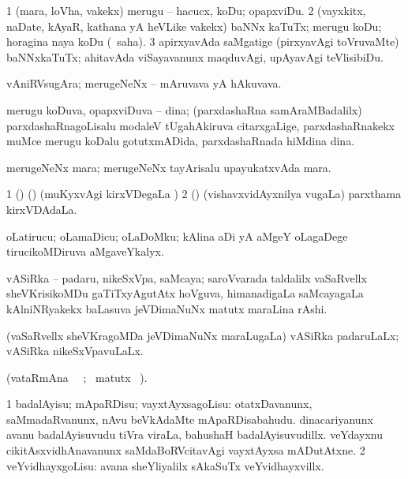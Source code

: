 \bentry
{} 
\gl{\sakirx}
\expl{}
\bmng
\bnum
\num{1} (mara, loVha, \mo vakekx) merugu -- hacucx, koDu; opapxviDu. 
\num{2} (vayxkitx, naDate, kAyaR, kathana yA heVLike \mo vakekx) baNNx kaTuTx; merugu koDu; horagina naya koDu (\akirx\ saha). 
\num{3} apirxyavAda saMgatige (pirxyavAgi toVruvaMte) baNNxkaTuTx; ahitavAda viSayavanunx maqduvAgi, upAyavAgi teVlisibiDu. 
\enum
\emng
\eentry

\bentry
{} 
\gl{\nA}
\expl{}
\bmng
 vAniRVsugAra; merugeNeNx -- mAruvava yA hAkuvava. 
\emng
\eentry

\bentry
{} 
\gl{\nA}
\expl{}
\bmng
 merugu koDuva, opapxviDuva -- dina; (parxdashaRna samAraMBadalilx) parxdashaRnagoLisalu modaleV tUgahAkiruva citarxgaLige, parxdashaRnakekx muMce merugu koDalu gotutxmADida, parxdashaRnada hiMdina dina. 
\emng
\eentry

\bentry
{}
\gl{\nA}
\expl{}
\bmng
 merugeNeNx mara; merugeNeNx tayArisalu upayukatxvAda mara. 
\emng
\eentry

\bentry
{} 
\gl{\nA}
\bmng
\bnum
\num{1} (\birx) (\AmA) (muKyxvAgi kirxVDegaLa \vi)  
\num{2} (\ame) (vishavxvidAyxnilya \mo vugaLa) parxthama kirxVDAdaLa. 
\enum
\emng
\eentry

\bentry
{} 
\gl{\nA}
\expl{}
\bmng
 oLatirucu; oLamaDicu; oLaDoMku; kAlina aDi yA aMgeY oLagaDege tirucikoMDiruva aMgaveYkalyx. 
\emng
\eentry

\bentry
{} 
\gl{\nA}
\expl{}
\bmng
 vASiRka -- padaru, nikeSxVpa, saMcaya; saroVvarada taldalilx vaSaRvellx sheVKrisikoMDu gaTiTxyAgutAtx hoVguva, himanadigaLa saMcayagaLa kAlniNRyakekx baLasuva jeVDimaNuNx matutx maraLina rAshi. 
\emng
\eentry

\bentry
{} 
\gl{\gu}
\expl{}
\bmng
 (vaSaRvellx sheVKragoMDa jeVDimaNuNx maraLugaLa) vASiRka padaruLaLx; vASiRka nikeSxVpavuLaLx. 
\emng
\eentry

\bentry
{} 
\gl{\kirx}(vataRmAna \parxpu\ \Eva\ ; \BU\ matutx 
\BUkaq\ ). \bmng
\emng

\noindent
\gl{\sakirx}
\bmng
\bnum
\num{1} badalAyisu; mApaRDisu; vayxtAyxsagoLisu:  otatxDavanunx, saMmadaRvanunx, nAvu beVkAdaMte mApaRDisabahudu.  dinacariyanunx avanu badalAyisuvudu tiVra viraLa, bahushaH badalAyisuvudillx.  veYdayxnu cikitAsxvidhAnavanunx saMdaBoRVcitavAgi vayxtAyxsa mADutAtxne. 
\num{2} veYvidhayxgoLisu:  avana sheYliyalilx sAkaSuTx veYvidhayxvillx. 
\enum
\emng

